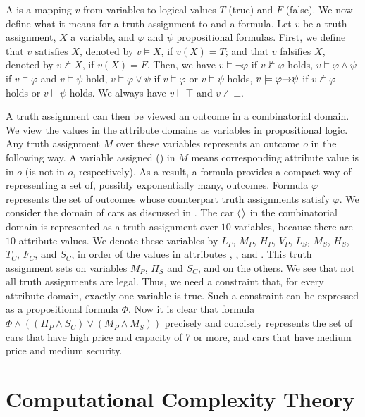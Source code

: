 A  is a mapping $v$ from variables to logical
values $T$ (true) and $F$ (false).
We now define what it means for a truth assignment to  
and  a formula.
Let $v$ be a truth assignment, $X$ a variable, and $\varphi$ and $\psi$
propositional formulas.
First, we define that $v$ satisfies $X$, denoted by $v \models X$,
if $v(X)=T$; and that $v$ falsifies $X$, denoted 
by $v \not\models X$, if $v(X)=F$.
Then, we have $v \models \neg \varphi$
if  $v \not\models \varphi$ holds, $v \models \varphi \land \psi$
if $v \models \varphi$ and $v \models \psi$ hold, $v \models \varphi \lor \psi$
if $v \models \varphi$ or $v \models \psi$ holds, $v \models \varphi \mathit{\rightarrow} \psi$
if $v \not\models \varphi$ holds or $v \models \psi$ holds.
We always have $v \models \top$ and $v \not\models \bot$.

A truth assignment can then be viewed an outcome in a combinatorial domain.
We view the values in the attribute domains as variables in propositional logic.
Any truth assignment $M$ over these variables represents an outcome $o$
in the following way.
A variable assigned  () in $M$ means corresponding 
attribute value is in $o$ (is not in $o$, respectively).
As a result, a formula provides a compact way of representing a set of, 
possibly exponentially many, outcomes.
Formula $\varphi$ represents the set of outcomes whose counterpart
truth assignments satisfy $\varphi$.
We consider the domain of cars as discussed in .
The car $\mathit{\langle}$$\mathit{\rangle}$ in the combinatorial domain
is represented as a truth assignment over $10$ variables, because
there are $10$ attribute values.
We denote these variables by $L_P$, $M_P$, $H_P$, $V_P$,
$L_S$, $M_S$, $H_S$, $T_C$, $F_C$, and $S_C$, in order of the
values in attributes , , and .
This truth assignment sets  on variables $M_P$,
$H_S$ and $S_C$, and  on the others.
We see that not all truth assignments are legal.
Thus, we need a constraint that, for every attribute domain,
exactly one variable is true.  Such a constraint can be
expressed as a propositional formula $\Phi$.
Now it is clear that formula $\Phi \land ((H_P \land S_C) \lor (M_P \land M_S))$ precisely
and concisely represents the set of cars that have high price and
capacity of 7 or more, and cars that have medium price and medium
security.


\section{Computational Complexity Theory \label{sec:comp_theory}}

